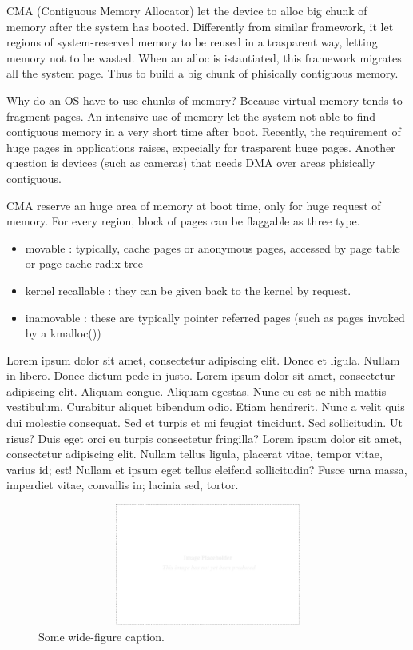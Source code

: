 \documentclass[a4paper,10pt]{article}
\begin{document}
\begin{multicols}{2}
CMA (Contiguous Memory Allocator) let the device to alloc big chunk of memory 
after the system has booted.
Differently from similar framework, it let regions of system-reserved memory to 
be reused in a trasparent way, letting memory not to be wasted.
When an alloc is istantiated, this framework migrates all the system page. Thus to build a
big chunk of phisically contiguous memory.

Why do an OS have to use chunks of memory? Because virtual memory tends to fragment
pages. An intensive use of memory let the system not able to find contiguous memory in a
very short time after boot.
Recently, the requirement of huge pages in applications raises, expecially for trasparent huge pages.
Another question is devices (such as cameras) that needs DMA over areas phisically contiguous.

CMA reserve an huge area of memory at boot time, only for huge request of memory.
For every region, block of pages can be flaggable as three type.
\begin{itemize}
 \item movable : typically, cache pages or anonymous pages, accessed by page table or page cache radix tree
 \item kernel recallable : they can be given back to the kernel by request.
 \item inamovable : these are typically pointer referred pages (such as pages invoked by a kmalloc()) 
\end{itemize}

Lorem ipsum dolor sit amet, consectetur adipiscing elit. Donec et ligula. Nullam
in libero. Donec dictum pede in justo. Lorem ipsum dolor sit amet, consectetur
adipiscing elit. Aliquam congue. Aliquam egestas. Nunc eu est ac nibh mattis
vestibulum. Curabitur aliquet bibendum odio. Etiam hendrerit. Nunc a velit quis
dui molestie consequat. Sed et turpis et mi feugiat tincidunt. Sed sollicitudin.
Ut risus? Duis eget orci eu turpis consectetur fringilla? Lorem ipsum dolor sit
amet, consectetur adipiscing elit. Nullam tellus ligula, placerat vitae, tempor
vitae, varius id; est! Nullam et ipsum eget tellus eleifend sollicitudin? Fusce
urna massa, imperdiet vitae, convallis in; lacinia sed, tortor.

\begin{figure}[t]
  \centering
 \includegraphics[width=16cm, height=4cm]{./eps/placeholder.eps}
 \caption{Some wide-figure caption.}
 \label{fig:myfigure2}
\end{figure}


\end{multicols}
\end{document}
